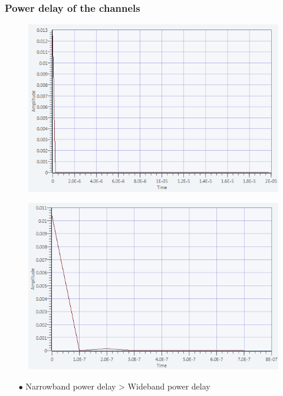 \documentclass[11pt]{beamer}
\begin{document}
\begin{frame}
\frametitle{Power delay of the channels}

\begin{figure}[!ht]
    \begin{minipage}[b]{0.48\linewidth}
        \centering \includegraphics[scale=0.35]{img/power_delay_narrow.png}
     \label{fig4}
    \end{minipage}\hfill
    \begin{minipage}[b]{0.48\linewidth}
         \centering \includegraphics[scale=0.35]{img/power_delay_wideband.png}
    \end{minipage}
\end{figure}
\begin{itemize}
\item[$\bullet$] Narrowband power delay > Wideband power delay  
\end{itemize}
\end{frame}
\end{document}
